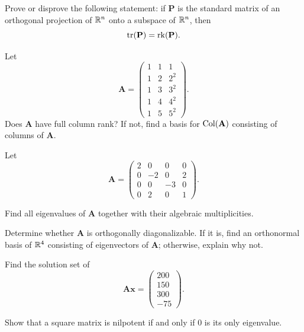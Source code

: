 \begin{problem}
Prove or disprove the following statement: if $\mathbf P$ is the standard matrix of an orthogonal projection of $\mathbb{R}^n$ onto a subspace of $\mathbb{R}^n$, then
\[
\operatorname{tr}(\mathbf P)=\operatorname{rk}(\mathbf P).
\]
\end{problem}

\begin{problem}
Let
\[
\mathbf A=
\begin{pmatrix}
1&1&1\\
1&2&2^2\\
1&3&3^2\\
1&4&4^2\\
1&5&5^2
\end{pmatrix}.
\]
Does $\mathbf A$ have full column rank? If not, find a basis for $\operatorname{Col}(\mathbf A)$ consisting of columns of $\mathbf A$.
\end{problem}

\begin{problem}
Let
\[
\mathbf A=
\begin{pmatrix}
2&0&0&0\\
0&-2&0&2\\
0&0&-3&0\\
0&2&0&1
\end{pmatrix}.
\]
\begin{problemsubparts}
\item Find all eigenvalues of $\mathbf A$ together with their algebraic multiplicities.
\item Determine whether $\mathbf A$ is orthogonally diagonalizable. If it is, find an orthonormal basis of $\mathbb{R}^4$ consisting of eigenvectors of $\mathbf A$; otherwise, explain why not.
\item Find the solution set of
\[
\mathbf A\mathbf x=
\begin{pmatrix}
200\\150\\300\\-75
\end{pmatrix}.
\]
\end{problemsubparts}
\end{problem}

\begin{problem}
Show that a square matrix is nilpotent if and only if $0$ is its only eigenvalue.
\end{problem}

